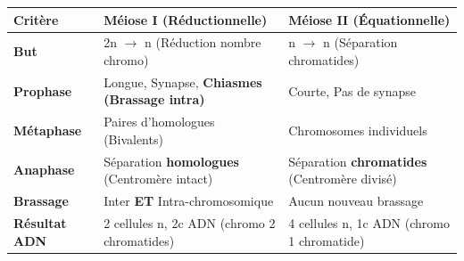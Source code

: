 \documentclass[11pt]{article}
\begin{document}
\begin{methode}
\begin{enumerate}
    \end{enumerate}
    \begin{center}
        \begin{tabularx}{\linewidth}{|l|X|X|}\hline
            \rowcolor{popblueL} \textbf{Critère} & \textbf{Méiose I (Réductionnelle)} & \textbf{Méiose II (Équationnelle)} \\ \hline
            \textbf{But} & 2n $\rightarrow$ n (Réduction nombre chromo) & n $\rightarrow$ n (Séparation chromatides) \\ \hline
            \textbf{Prophase} & Longue, Synapse, \textbf{Chiasmes (Brassage intra)} & Courte, Pas de synapse \\ \hline
            \textbf{Métaphase} & Paires d'homologues (Bivalents) & Chromosomes individuels \\ \hline
            \textbf{Anaphase} & Séparation \textbf{homologues} (Centromère intact) & Séparation \textbf{chromatides} (Centromère divisé) \\ \hline
            \textbf{Brassage} & Inter \textbf{ET} Intra-chromosomique & Aucun nouveau brassage \\ \hline
            \textbf{Résultat ADN} & 2 cellules n, 2c ADN (chromo 2 chromatides) & 4 cellules n, 1c ADN (chromo 1 chromatide) \\ \hline
        \end{tabularx}
    \end{center}
\end{methode}
\end{document}

